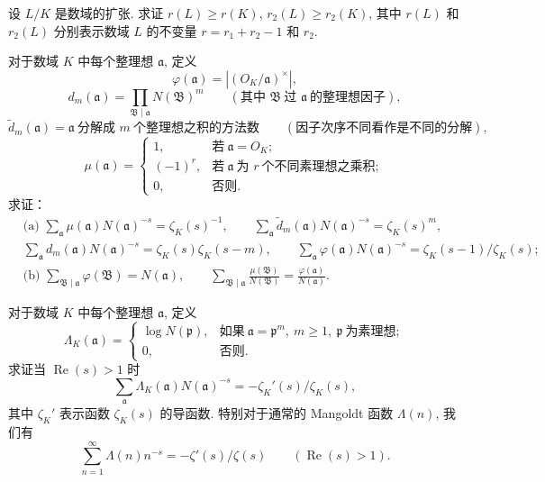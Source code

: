 \begin{Exercises}
  \item 设 $L/K$ 是数域的扩张. 求证 $r(L)\geqslant r(K)$, $r_2(L)\geqslant r_2(K)$, 其中 $r(L)$ 和 $r_2(L)$ 分别表示数域 $L$ 的不变量 $r=r_1+r_2-1$ 和 $r_2$. 
  \item 对于数域 $K$ 中每个整理想 $\mathfrak{a}$, 定义
  \[
    \varphi(\mathfrak{a})=\left|(O_K/\mathfrak{a})^{\times}\right|,
  \]
  \[
    d_m(\mathfrak{a})=\prod_{\mathfrak{B}\mid\mathfrak{a}}N(\mathfrak{B})^m\qquad(\text{其中 } \mathfrak{B}\ \text{过 } \mathfrak{a}\ \text{的整理想因子}),
  \]
  \[
    \widetilde{d}_m(\mathfrak{a})=\mathfrak{a}\ \text{分解成 } m\ \text{个整理想之积的方法数}\qquad(\text{因子次序不同看作是不同的分解}),
  \]
  \[
    \mu(\mathfrak{a})=\begin{cases}
      1, & \text{若}\ \mathfrak{a}=O_K;\\
      (-1)^r, & \text{若}\ \mathfrak{a}\ \text{为 } r\ \text{个不同素理想之乘积};\\
      0, & \text{否则}.
    \end{cases}
  \]
  求证：
  \begin{align*}
    &\text{(a) } \sum_{\mathfrak{a}}\mu(\mathfrak{a})N(\mathfrak{a})^{-s}=\zeta_K(s)^{-1},\qquad
    \sum_{\mathfrak{a}}\widetilde{d}_m(\mathfrak{a})N(\mathfrak{a})^{-s}=\zeta_K(s)^m,\\
    &\sum_{\mathfrak{a}}d_m(\mathfrak{a})N(\mathfrak{a})^{-s}=\zeta_K(s)\zeta_K(s-m),\qquad
    \sum_{\mathfrak{a}}\varphi(\mathfrak{a})N(\mathfrak{a})^{-s}=\zeta_K(s-1)/\zeta_K(s);\\
    &\text{(b) } \sum_{\mathfrak{B}\mid\mathfrak{a}}\varphi(\mathfrak{B})=N(\mathfrak{a}),\qquad
    \sum_{\mathfrak{B}\mid\mathfrak{a}}\frac{\mu(\mathfrak{B})}{N(\mathfrak{B})}=\frac{\varphi(\mathfrak{a})}{N(\mathfrak{a})}.
  \end{align*}
  \item 对于数域 $K$ 中每个整理想 $\mathfrak{a}$, 定义
  \[
    \Lambda_K(\mathfrak{a})=\begin{cases}
      \log N(\mathfrak{p}), & \text{如果}\ \mathfrak{a}=\mathfrak{p}^m,\ m\geqslant 1,\ \mathfrak{p}\ \text{为素理想};\\
      0, & \text{否则}.
    \end{cases}
  \]
  求证当 $\operatorname{Re}(s)>1$ 时
  \[
    \sum_{\mathfrak{a}}\Lambda_K(\mathfrak{a})N(\mathfrak{a})^{-s}=-\zeta_K'(s)/\zeta_K(s),
  \]
  其中 $\zeta_K'$ 表示函数 $\zeta_K(s)$ 的导函数. 特别对于通常的 Mangoldt 函数 $\Lambda(n)$, 我们有
  \[
    \sum_{n=1}^{\infty}\Lambda(n)n^{-s}=-\zeta'(s)/\zeta(s)\qquad(\operatorname{Re}(s)>1).
  \]
\end{Exercises}
